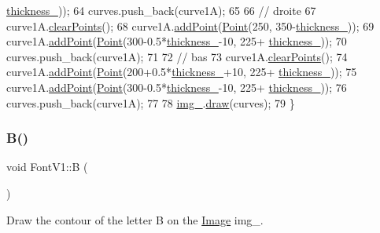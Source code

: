 \begin{DoxyCode}
      \mbox{\hyperlink{class_font_v1_aed8040e76be9a52833627b92f0fb4e5f}{thickness\_}}));
64     curves.push\_back(curve1A);
65 
66     \textcolor{comment}{// droite}
67     curve1A.\mbox{\hyperlink{class_bezier_curve_a0ba8ce66d5af5971ae6a1b506029728e}{clearPoints}}();
68     curve1A.\mbox{\hyperlink{class_bezier_curve_a38d16c18b36ae45619b05e26e226cf34}{addPoint}}(\mbox{\hyperlink{class_point}{Point}}(250, 350-\mbox{\hyperlink{class_font_v1_aed8040e76be9a52833627b92f0fb4e5f}{thickness\_}}));
69     curve1A.\mbox{\hyperlink{class_bezier_curve_a38d16c18b36ae45619b05e26e226cf34}{addPoint}}(\mbox{\hyperlink{class_point}{Point}}(300-0.5*\mbox{\hyperlink{class_font_v1_aed8040e76be9a52833627b92f0fb4e5f}{thickness\_}}-10, 225+
      \mbox{\hyperlink{class_font_v1_aed8040e76be9a52833627b92f0fb4e5f}{thickness\_}}));
70     curves.push\_back(curve1A);
71 
72     \textcolor{comment}{// bas}
73     curve1A.\mbox{\hyperlink{class_bezier_curve_a0ba8ce66d5af5971ae6a1b506029728e}{clearPoints}}();
74     curve1A.\mbox{\hyperlink{class_bezier_curve_a38d16c18b36ae45619b05e26e226cf34}{addPoint}}(\mbox{\hyperlink{class_point}{Point}}(200+0.5*\mbox{\hyperlink{class_font_v1_aed8040e76be9a52833627b92f0fb4e5f}{thickness\_}}+10, 225+
      \mbox{\hyperlink{class_font_v1_aed8040e76be9a52833627b92f0fb4e5f}{thickness\_}}));
75     curve1A.\mbox{\hyperlink{class_bezier_curve_a38d16c18b36ae45619b05e26e226cf34}{addPoint}}(\mbox{\hyperlink{class_point}{Point}}(300-0.5*\mbox{\hyperlink{class_font_v1_aed8040e76be9a52833627b92f0fb4e5f}{thickness\_}}-10, 225+
      \mbox{\hyperlink{class_font_v1_aed8040e76be9a52833627b92f0fb4e5f}{thickness\_}}));
76     curves.push\_back(curve1A);
77 
78     \mbox{\hyperlink{class_font_v1_a00569e3e3c4b70f437b63f396f735fb0}{img\_}}.\mbox{\hyperlink{class_image_a8d162f3cab956131d58708c09aa560b0}{draw}}(curves);
79 \}
\end{DoxyCode}
\mbox{\label{class_font_v1_a620ee7876d479807f73481f27be48f2a}} 
\subsubsection{\texorpdfstring{B()}{B()}}
{\footnotesize\ttfamily void Font\+V1\+::B (\begin{DoxyParamCaption}{ }\end{DoxyParamCaption})}



Draw the contour of the letter B on the \mbox{\hyperlink{class_image}{Image}} img\+\_\+. 


